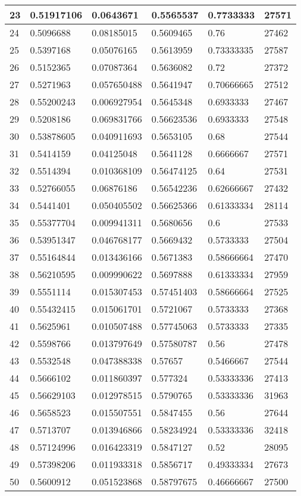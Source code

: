 \begin{longtable}{|l|l|l|l|l|l|}
23 & 0.51917106 & 0.0643671 & 0.5565537 & 0.7733333 & 27571 \\ \hline 
24 & 0.5096688 & 0.08185015 & 0.5609465 & 0.76 & 27462 \\ \hline 
25 & 0.5397168 & 0.05076165 & 0.5613959 & 0.73333335 & 27587 \\ \hline 
26 & 0.5152365 & 0.07087364 & 0.5636082 & 0.72 & 27372 \\ \hline 
27 & 0.5271963 & 0.057650488 & 0.5641947 & 0.70666665 & 27512 \\ \hline 
28 & 0.55200243 & 0.006927954 & 0.5645348 & 0.6933333 & 27467 \\ \hline 
29 & 0.5208186 & 0.069831766 & 0.56623536 & 0.6933333 & 27548 \\ \hline 
30 & 0.53878605 & 0.040911693 & 0.5653105 & 0.68 & 27544 \\ \hline 
31 & 0.5414159 & 0.04125048 & 0.5641128 & 0.6666667 & 27571 \\ \hline 
32 & 0.5514394 & 0.010368109 & 0.56474125 & 0.64 & 27531 \\ \hline 
33 & 0.52766055 & 0.06876186 & 0.56542236 & 0.62666667 & 27432 \\ \hline 
34 & 0.5441401 & 0.050405502 & 0.56625366 & 0.61333334 & 28114 \\ \hline 
35 & 0.55377704 & 0.009941311 & 0.5680656 & 0.6 & 27533 \\ \hline 
36 & 0.53951347 & 0.046768177 & 0.5669432 & 0.5733333 & 27504 \\ \hline 
37 & 0.55164844 & 0.013436166 & 0.5671383 & 0.58666664 & 27470 \\ \hline 
38 & 0.56210595 & 0.009990622 & 0.5697888 & 0.61333334 & 27959 \\ \hline 
39 & 0.5551114 & 0.015307453 & 0.57451403 & 0.58666664 & 27525 \\ \hline 
40 & 0.55432415 & 0.015061701 & 0.5721067 & 0.5733333 & 27368 \\ \hline 
41 & 0.5625961 & 0.010507488 & 0.57745063 & 0.5733333 & 27335 \\ \hline 
42 & 0.5598766 & 0.013797649 & 0.57580787 & 0.56 & 27478 \\ \hline 
43 & 0.5532548 & 0.047388338 & 0.57657 & 0.5466667 & 27544 \\ \hline 
44 & 0.5666102 & 0.011860397 & 0.577324 & 0.53333336 & 27413 \\ \hline 
45 & 0.56629103 & 0.012978515 & 0.5790765 & 0.53333336 & 31963 \\ \hline 
46 & 0.5658523 & 0.015507551 & 0.5847455 & 0.56 & 27644 \\ \hline 
47 & 0.5713707 & 0.013946866 & 0.58234924 & 0.53333336 & 32418 \\ \hline 
48 & 0.57124996 & 0.016423319 & 0.5847127 & 0.52 & 28095 \\ \hline 
49 & 0.57398206 & 0.011933318 & 0.5856717 & 0.49333334 & 27673 \\ \hline 
50 & 0.5600912 & 0.051523868 & 0.58797675 & 0.46666667 & 27500 \\ \hline 
\end{longtable}